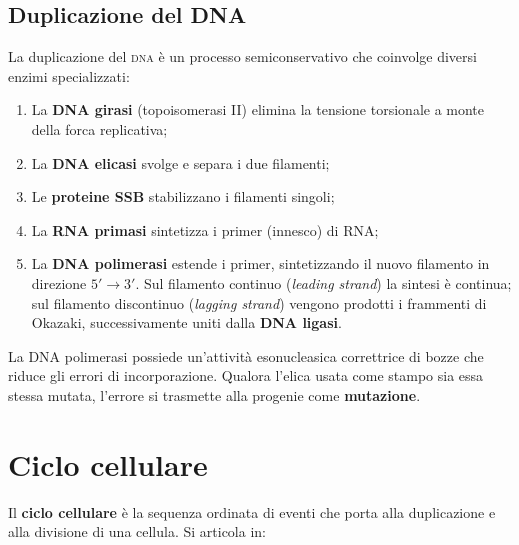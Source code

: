 \documentclass[11pt,a4paper,openright,twoside]{book}
\theoremstyle{definition}
\theoremstyle{plain}
\theoremstyle{remark}
\newcommand{\dna}{\textsc{dna}}
\begin{document}
\subsection{Duplicazione del DNA}

La duplicazione del \dna{} è un processo semiconservativo che coinvolge diversi enzimi specializzati:

\begin{enumerate}
  \item La \textbf{DNA girasi} (topoisomerasi II) elimina la tensione torsionale a monte della forca replicativa;
  \item La \textbf{DNA elicasi} svolge e separa i due filamenti;
  \item Le \textbf{proteine SSB} stabilizzano i filamenti singoli;
  \item La \textbf{RNA primasi} sintetizza i primer (innesco) di RNA;
  \item La \textbf{DNA polimerasi} estende i primer, sintetizzando il nuovo filamento in direzione $5'\!\to\!3'$. Sul filamento continuo (\textit{leading strand}) la sintesi è continua; sul filamento discontinuo (\textit{lagging strand}) vengono prodotti i frammenti di Okazaki, successivamente uniti dalla \textbf{DNA ligasi}.
\end{enumerate}

\begin{tcolorbox}[notebox, title={Errori di replicazione}]
  La DNA polimerasi possiede un'attività esonucleasica correttrice di bozze che riduce gli errori di incorporazione. Qualora l'elica usata come stampo sia essa stessa mutata, l'errore si trasmette alla progenie come \textbf{mutazione}.
\end{tcolorbox}

\section{Ciclo cellulare}

Il \textbf{ciclo cellulare} è la sequenza ordinata di eventi che porta alla duplicazione e alla divisione di una cellula. Si articola in:
\end{document}

